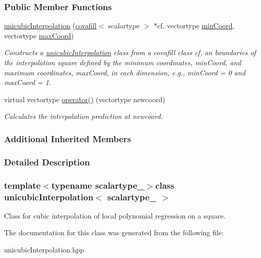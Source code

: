 \subsubsection*{Public Member Functions}
\begin{DoxyCompactItemize}
\item 
\hypertarget{classunicubicInterpolation_ac693f198959412ec4ad42a6a7ceba4c0}{}\hyperlink{classunicubicInterpolation_ac693f198959412ec4ad42a6a7ceba4c0}{unicubic\+Interpolation} (\hyperlink{classcovafill}{covafill}$<$ scalartype $>$ $\ast$cf, vectortype \hyperlink{classncubicInterpolation_a5360669149e2182a478f74941c4fb008}{min\+Coord}, vectortype \hyperlink{classncubicInterpolation_a3bd706effb987f94c92f4c89605c7e7c}{max\+Coord})\label{classunicubicInterpolation_ac693f198959412ec4ad42a6a7ceba4c0}

\begin{DoxyCompactList}\small\item\em Constructs a \hyperlink{classunicubicInterpolation}{unicubic\+Interpolation} class from a covafill class {\itshape cf}, an boundaries of the interpolation square defined by the minimum coordinates, {\itshape min\+Coord}, and maximum coordinates, {\itshape max\+Coord}, in each dimension, e.\+g., min\+Coord = 0 and max\+Coord = 1. \end{DoxyCompactList}\item 
\hypertarget{classunicubicInterpolation_a9a385ca116d23bf0280dd12cc3887ac4}{}virtual vectortype \hyperlink{classunicubicInterpolation_a9a385ca116d23bf0280dd12cc3887ac4}{operator()} (vectortype newcoord)\label{classunicubicInterpolation_a9a385ca116d23bf0280dd12cc3887ac4}

\begin{DoxyCompactList}\small\item\em Calculates the interpolation prediction at {\itshape newcoord}. \end{DoxyCompactList}\end{DoxyCompactItemize}
\subsubsection*{Additional Inherited Members}


\subsubsection{Detailed Description}
\subsubsection*{template$<$typename scalartype\+\_\+$>$class unicubic\+Interpolation$<$ scalartype\+\_\+ $>$}

Class for cubic interpolation of local polynomial regression on a square. 

The documentation for this class was generated from the following file\+:\begin{DoxyCompactItemize}
\item 
unicubic\+Interpolation.\+hpp\end{DoxyCompactItemize}
